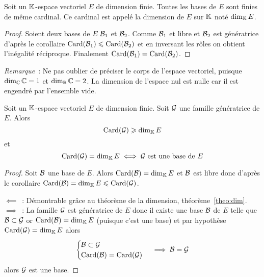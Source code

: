 \begin{theo}
  \label{theo:dim}
  Soit un \(\mathbb{K}\)-espace vectoriel \(E\) de dimension finie. Toutes les bases de
  \(E\) sont finies de même cardinal. Ce cardinal est appelé la dimension de
  \(E\) sur \(\mathbb{K}\) noté \(\operatorname{dim}_{\mathbb{K}} E\).
\end{theo}
\begin{proof}
  Soient deux bases de \(E\) \(\mathcal{B}_1\) et \(\mathcal{B}_2\). Comme \(\mathcal{B}_1\) et libre et
  \(\mathcal{B}_2\) est génératrice d'après le corollaire \(\operatorname{Card}(\mathcal{B}_1) \leqslant
  \operatorname{Card}(\mathcal{B}_2)\) et en inversant les rôles on obtient l'inégalité réciproque.
  Finalement \(\operatorname{Card}(\mathcal{B}_1)=\operatorname{Card}(\mathcal{B}_2)\).
\end{proof}

\emph{Remarque}~: Ne pas oublier de préciser le corps de l'espace vectoriel,
puisque \(\operatorname{dim}_{\mathbb{C}} \mathbb{C}=1\) et \(\operatorname{dim}_{\mathbb{R}} \mathbb{C}=2\). La dimension de l'espace nul est
nulle car il est engendré par l'ensemble vide.

\begin{theo}
  Soit un \(\mathbb{K}\)-espace vectoriel \(E\) de dimension finie. Soit \(\mathcal{G}\) une
  famille génératrice de \(E\). Alors
  \begin{equation}
    \operatorname{Card}(\mathcal{G}) \geqslant \operatorname{dim}_{\mathbb{K}} E
  \end{equation}
  et
  \begin{equation}
    \operatorname{Card}(\mathcal{G})=\operatorname{dim}_{\mathbb{K}} E \iff \mathcal{G} \text{~est une base de } E
  \end{equation}
\end{theo}
\begin{proof}
  Soit \(\mathcal{B}\) une base de \(E\). Alors \(\operatorname{Card}(\mathcal{B})=\operatorname{dim}_{\mathbb{K}} E\) et \(\mathcal{B}\) est
  libre donc d'après le corollaire \(\operatorname{Card}(\mathcal{B}) = \operatorname{dim}_{\mathbb{K}} E \leqslant
  \operatorname{Card}(\mathcal{G})\).

  \(\impliedby\)~: Démontrable grâce au théorème de la dimension, théorème~\ref{theo:dim}.
  \(\implies\)~: La famille \(\mathcal{G}\) est génératrice de \(E\) donc il existe une
  base \(\mathcal{B}\) de \(E\) telle que \(\mathcal{B} \subset \mathcal{G}\) or \(\operatorname{Card}(\mathcal{B}) = \operatorname{dim}_{\mathbb{K}} E\)
  (puisque c'est une base) et par hypothèse \(\operatorname{Card}(\mathcal{G}) = \operatorname{dim}_{\mathbb{K}} E\) alors
  \begin{equation}
    \begin{cases} \mathcal{B} \subset \mathcal{G} \\ \operatorname{Card}(\mathcal{B}) = \operatorname{Card}(\mathcal{G}) \end{cases} \implies
      \mathcal{B}=\mathcal{G}
  \end{equation}
  alors \(\mathcal{G}\) est une base.
\end{proof}

